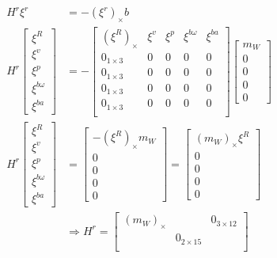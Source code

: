 \begin{equation}
    \begin{split}
        H^r \xi^r &= -(\xi^r)_{\times} b \\
        H^r \begin{bmatrix}
            \xi^R \\
            \xi^v \\
            \xi^p \\
            \xi^{b \omega} \\
            \xi^{b a}
        \end{bmatrix} &= -\begin{bmatrix}
            (\xi^R)_{\times} & \xi^v & \xi^p & \xi^{b \omega} & \xi^{b a} \\
            0_{1 \times 3} & 0 & 0 & 0 & 0 \\
            0_{1 \times 3} & 0 & 0 & 0 & 0 \\
            0_{1 \times 3} & 0 & 0 & 0 & 0 \\
            0_{1 \times 3} & 0 & 0 & 0 & 0 \\
        \end{bmatrix} 
        \begin{bmatrix}
            m_W \\
            0 \\
            0 \\
            0 \\
            0
        \end{bmatrix} \\
        H^r \begin{bmatrix}
            \xi^R \\
            \xi^v \\
            \xi^p \\
            \xi^{b \omega} \\
            \xi^{b a}
        \end{bmatrix} &=  \begin{bmatrix}
            - (\xi^R)_{\times} m_W \\
            0 \\
            0 \\
            0 \\
            0
        \end{bmatrix} 
        = \begin{bmatrix}
            (m_W)_{\times} \xi^R  \\
            0 \\
            0 \\
            0 \\
            0
        \end{bmatrix} \\
        &\Rightarrow H^r = \begin{bmatrix}
        (m_W)_{\times} & & 0_{3 \times 12} \\
        & 0_{2\times 15} &\\
        \end{bmatrix}
    \end{split}
    \label{eq: H^r mag InEKF}
\end{equation}
